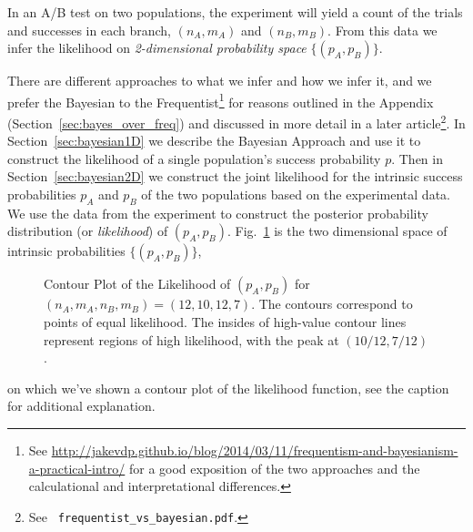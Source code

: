\documentclass[letterpaper,12pt]{article}
\begin{document}
In an A/B test on two populations, the experiment will yield a count
of the trials and successes in each branch, \((n_A, m_A)\) and \((n_B,
m_B)\). From this data we infer the likelihood on
{\em 2-dimensional probability space} \(\{(p_A,p_B)\}\).

There are different approaches to what we infer and how we infer it,
and we prefer the Bayesian to the Frequentist\footnote{See
  \url{http://jakevdp.github.io/blog/2014/03/11/frequentism-and-bayesianism-a-practical-intro/}
  for a good exposition of the two approaches and the calculational
  and interpretational differences.} for reasons outlined in the
Appendix (Section~\ref{sec:bayes_over_freq}) and discussed in more
detail in a later article\footnote{See {\tt
    frequentist\_vs\_bayesian.pdf}.}. In Section~\ref{sec:bayesian1D}
we describe the Bayesian Approach and use it to construct the
likelihood of a single population's success probability \(p\). Then in
Section~\ref{sec:bayesian2D} we construct the joint likelihood for the
intrinsic success probabilities \(p_A\) and \(p_B\) of the two
populations based on the experimental data.  We use the data from the
experiment to construct the posterior probability distribution (or
{\em likelihood}) of \((p_A, p_B)\). Fig.~\ref{fig:likelihood} is the
two dimensional space of intrinsic probabilities \(\{(p_A,p_B)\}\),
\begin{figure}[ht!]
\centering
\caption{Contour Plot of the Likelihood of \((p_A, p_B)\) for \((n_A,
  m_A, n_B, m_B) = (12,10,12,7)\). The contours correspond to points
  of equal likelihood. The insides of high-value contour lines
  represent regions of high likelihood, with the peak at \((10/12,
  7/12)\). \label{fig:likelihood}}
\end{figure}
on which we've shown a contour plot of the likelihood function, see
the caption for additional explanation.
\end{document}
